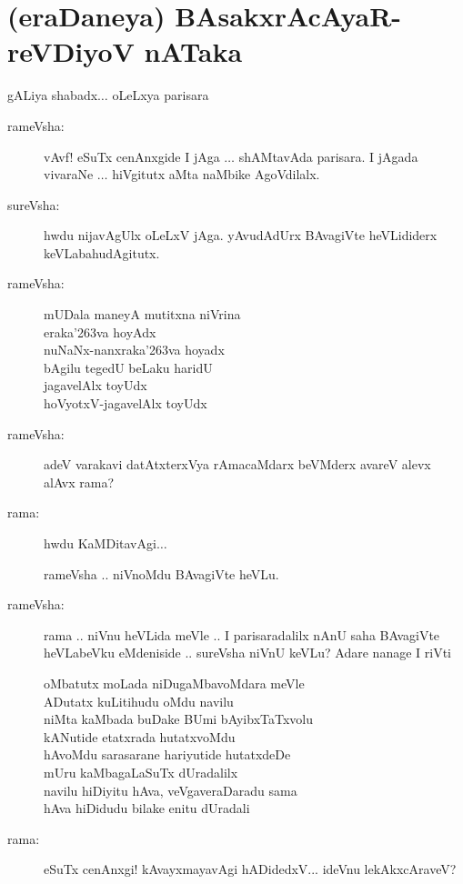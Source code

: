 \chapter[(eraDaneya) BAsakxrAcAyaR - reVDiyoV nATaka]{(eraDaneya) BAsakxrAcAyaR\break - reVDiyoV nATaka}

gALiya shabadx$\ldots$ oLeLxya parisara
\begin{description}
\item[rameVsha:] vAvf! eSuTx cenAnxgide I jAga $\ldots$ shAMtavAda parisara. I jAgada vivaraNe $\ldots$ hiVgitutx aMta naMbike AgoVdilalx.

\item[sureVsha:] hwdu nijavAgUlx oLeLxV jAga. yAvudAdUrx BAvagiVte heVLididerx keVLabahudAgitutx.

\item[rameVsha:] mUDala maneyA mutitxna niVrina\\
eraka\char'263va hoyAdx\\
nuNaNx-nanxraka\char'263va hoyadx\\
bAgilu tegedU beLaku haridU\\
jagavelAlx toyUdx\\
hoVyotxV-jagavelAlx toyUdx

\item[rameVsha:] adeV varakavi datAtxterxVya rAmacaMdarx beVMderx avareV alevx alAvx rama?

\item[rama:] hwdu KaMDitavAgi$\ldots$

rameVsha .. niVnoMdu BAvagiVte heVLu.

\item[rameVsha:] rama .. niVnu heVLida meVle .. I parisaradalilx nAnU saha BAvagiVte heVLabeVku eMdeniside .. sureVsha niVnU keVLu? Adare nanage I riVti 

\smallskip
oMbatutx moLada niDugaMbavoMdara meVle\\
ADutatx kuLitihudu oMdu navilu\\
niMta kaMbada buDake BUmi bAyibxTaTxvolu\\
kANutide etatxrada hutatxvoMdu\\
hAvoMdu sarasarane hariyutide hutatxdeDe\\
mUru kaMbagaLaSuTx dUradalilx\\
navilu hiDiyitu hAva, veVgaveraDaradu sama\\
hAva hiDidudu bilake enitu dUradali
\smallskip

\item[rama:] eSuTx cenAnxgi! kAvayxmayavAgi hADidedxV... ideVnu lekAkxcAraveV?


\end{description}
